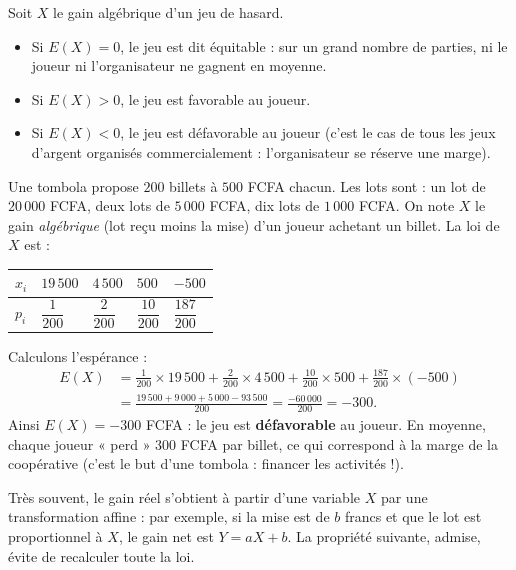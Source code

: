 \documentclass[11pt]{article}
\newcommand{\cle}[1]{{\popxbold\color{popdark}#1}}
\newcounter{popsec}
\newcounter{popsub}
\newcommand{\courssub}[1]{%
  \stepcounter{popsub}%
  \par\vspace{9pt}\noindent{\popxbold\fontsize{11.5}{13}\selectfont\color{popink}{\color{poporange}\thepopsec.\thepopsub}\hspace{6pt}#1}\par\nopagebreak\vspace{4pt}
}
\begin{document}
\begin{definition}
Soit $X$ le gain algébrique d'un jeu de hasard.
\begin{itemize}
\item Si $E(X) = 0$, le jeu est dit \cle{équitable} : sur un grand nombre de parties, ni le joueur ni l'organisateur ne gagnent en moyenne.
\item Si $E(X) > 0$, le jeu est \cle{favorable} au joueur.
\item Si $E(X) < 0$, le jeu est \cle{défavorable} au joueur (c'est le cas de tous les jeux d'argent organisés commercialement : l'organisateur se réserve une marge).
\end{itemize}
\end{definition}

\begin{exemplebox}
Une tombola propose $200$ billets à $500$ FCFA chacun. Les lots sont : un lot de $20\,000$ FCFA, deux lots de $5\,000$ FCFA, dix lots de $1\,000$ FCFA. On note $X$ le gain \emph{algébrique} (lot reçu moins la mise) d'un joueur achetant un billet. La loi de $X$ est :
\begin{center}
\begin{tabularx}{\linewidth}{|l|X|X|X|X|}
\hline
\rowcolor{popblueL} $x_i$ & $19\,500$ & $4\,500$ & $500$ & $-500$ \\
\hline
$p_i$ & $\dfrac{1}{200}$ & $\dfrac{2}{200}$ & $\dfrac{10}{200}$ & $\dfrac{187}{200}$ \\
\hline
\end{tabularx}
\end{center}
Calculons l'espérance :
\begin{align*}
E(X) &= \frac{1}{200}\times 19\,500 + \frac{2}{200}\times 4\,500 + \frac{10}{200}\times 500 + \frac{187}{200}\times(-500)\\
&= \frac{19\,500 + 9\,000 + 5\,000 - 93\,500}{200} = \frac{-60\,000}{200} = -300.
\end{align*}
Ainsi $E(X) = -300$ FCFA : le jeu est \textbf{défavorable} au joueur. En moyenne, chaque joueur « perd » $300$ FCFA par billet, ce qui correspond à la marge de la coopérative (c'est le but d'une tombola : financer les activités !).
\end{exemplebox}

\courssub{Linéarité de l'espérance}

Très souvent, le gain réel s'obtient à partir d'une variable $X$ par une transformation affine : par exemple, si la mise est de $b$ francs et que le lot est proportionnel à $X$, le gain net est $Y = aX + b$. La propriété suivante, admise, évite de recalculer toute la loi.
\end{document}
